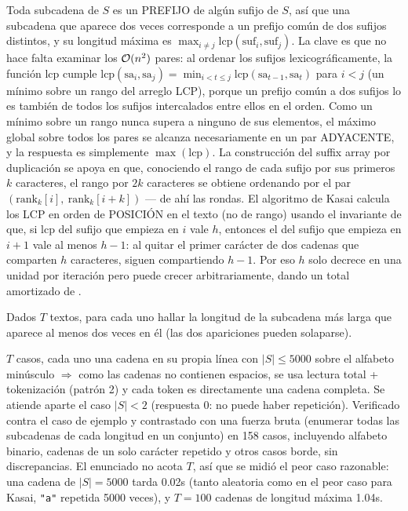  Toda subcadena de $S$ es un PREFIJO de algún sufijo de $S$, así que una subcadena que aparece dos veces corresponde a un prefijo común de dos sufijos distintos, y su longitud máxima es $\max_{i\neq j} \mathrm{lcp}(\text{suf}_i, \text{suf}_j)$. La clave es que no hace falta examinar los $\mathcal{O}(n^2)$ pares: al ordenar los sufijos lexicográficamente, la función $\mathrm{lcp}$ cumple $\mathrm{lcp}(\text{sa}_i,\text{sa}_j) = \min_{i < t \le j} \mathrm{lcp}(\text{sa}_{t-1},\text{sa}_t)$ para $i<j$ (un mínimo sobre un rango del arreglo LCP), porque un prefijo común a dos sufijos lo es también de todos los sufijos intercalados entre ellos en el orden. Como un mínimo sobre un rango nunca supera a ninguno de sus elementos, el máximo global sobre todos los pares se alcanza necesariamente en un par ADYACENTE, y la respuesta es simplemente $\max(\text{lcp})$. La construcción del suffix array por duplicación se apoya en que, conociendo el rango de cada sufijo por sus primeros $k$ caracteres, el rango por $2k$ caracteres se obtiene ordenando por el par $(\mathrm{rank}_k[i],\ \mathrm{rank}_k[i+k])$ — de ahí las  rondas. El algoritmo de Kasai calcula los LCP en orden de POSICIÓN en el texto (no de rango) usando el invariante de que, si $\mathrm{lcp}$ del sufijo que empieza en $i$ vale $h$, entonces el del sufijo que empieza en $i+1$ vale al menos $h-1$: al quitar el primer carácter de dos cadenas que comparten $h$ caracteres, siguen compartiendo $h-1$. Por eso $h$ solo decrece en una unidad por iteración pero puede crecer arbitrariamente, dando un total amortizado de .~\cite{manber1993,kasai2001}


Dados $T$ textos, para cada uno hallar la longitud de la subcadena más larga que aparece al menos dos veces en él (las dos apariciones pueden solaparse).

 $T$ casos, cada uno una cadena en su propia línea con $|S| \le 5000$ sobre el alfabeto minúsculo $\Rightarrow$ como las cadenas no contienen espacios, se usa lectura total + tokenización (patrón 2) y cada token es directamente una cadena completa. Se atiende aparte el caso $|S| < 2$ (respuesta $0$: no puede haber repetición). Verificado contra el caso de ejemplo y contrastado con una fuerza bruta (enumerar todas las subcadenas de cada longitud en un conjunto) en 158 casos, incluyendo alfabeto binario, cadenas de un solo carácter repetido y otros casos borde, sin discrepancias. El enunciado no acota $T$, así que se midió el peor caso razonable: una cadena de $|S|=5000$ tarda \aprox{}0.02s (tanto aleatoria como en el peor caso para Kasai, \texttt{"a"} repetida 5000 veces), y $T=100$ cadenas de longitud máxima \aprox{}1.04s.

